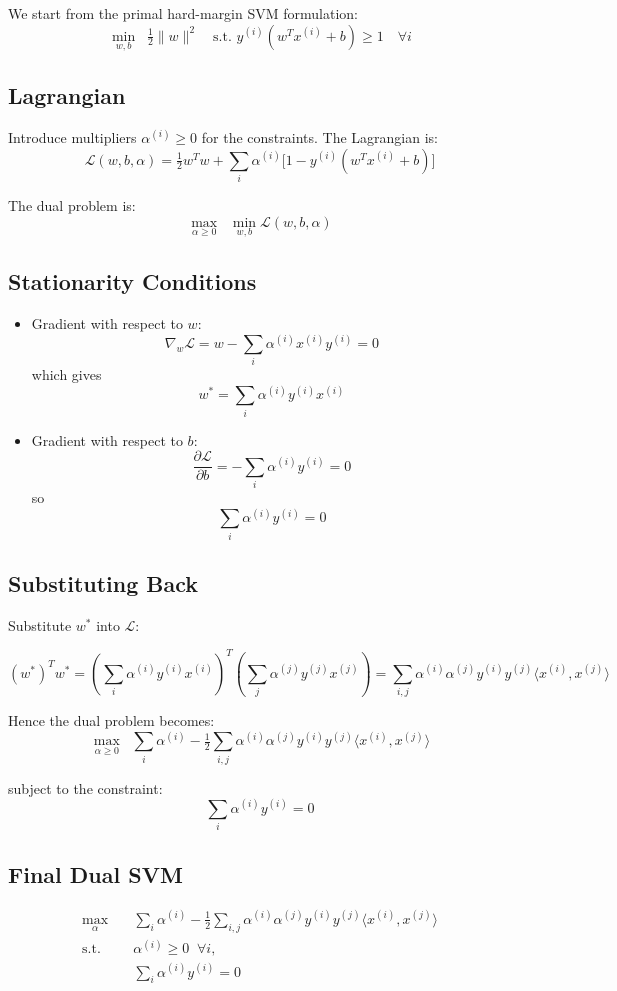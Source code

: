 \documentclass[11pt]{article}
\begin{document}
We start from the primal hard-margin SVM formulation:
\[
\min_{w,b} \;\; \tfrac{1}{2} \|w\|^2 
\quad \text{s.t. } y^{(i)} (w^T x^{(i)} + b) \geq 1 \quad \forall i
\]

\subsection*{Lagrangian}
Introduce multipliers $\alpha^{(i)} \geq 0$ for the constraints. The Lagrangian is:
\[
\mathcal{L}(w,b,\alpha) 
= \tfrac{1}{2} w^T w 
+ \sum_i \alpha^{(i)} \Big[1 - y^{(i)} (w^T x^{(i)} + b)\Big]
\]

The dual problem is:
\[
\max_{\alpha \geq 0} \;\; \min_{w,b} \mathcal{L}(w,b,\alpha)
\]

\subsection*{Stationarity Conditions}

\begin{itemize}
    \item Gradient with respect to $w$:
    \[
    \nabla_w \mathcal{L} = w - \sum_i \alpha^{(i)} x^{(i)} y^{(i)} = 0
    \]
    which gives
    \[
    w^* = \sum_i \alpha^{(i)} y^{(i)} x^{(i)}
    \]

    \item Gradient with respect to $b$:
    \[
    \frac{\partial \mathcal{L}}{\partial b} 
    = - \sum_i \alpha^{(i)} y^{(i)} = 0
    \]
    so
    \[
    \sum_i \alpha^{(i)} y^{(i)} = 0
    \]
\end{itemize}

\subsection*{Substituting Back}
Substitute $w^*$ into $\mathcal{L}$:

\[
(w^*)^T w^* = 
\left( \sum_i \alpha^{(i)} y^{(i)} x^{(i)} \right)^T
\left( \sum_j \alpha^{(j)} y^{(j)} x^{(j)} \right)
= \sum_{i,j} \alpha^{(i)} \alpha^{(j)} y^{(i)} y^{(j)} \langle x^{(i)}, x^{(j)} \rangle
\]

Hence the dual problem becomes:
\[
\max_{\alpha \geq 0} 
\;\; \sum_i \alpha^{(i)} 
- \tfrac{1}{2} \sum_{i,j} \alpha^{(i)} \alpha^{(j)} y^{(i)} y^{(j)} \langle x^{(i)}, x^{(j)} \rangle
\]

subject to the constraint:
\[
\sum_i \alpha^{(i)} y^{(i)} = 0
\]

\subsection*{Final Dual SVM}
\[
\boxed{
\begin{aligned}
\max_{\alpha} \quad & 
\sum_i \alpha^{(i)} 
- \tfrac{1}{2} \sum_{i,j} \alpha^{(i)} \alpha^{(j)} y^{(i)} y^{(j)} \langle x^{(i)}, x^{(j)} \rangle \\
\text{s.t.} \quad & \alpha^{(i)} \geq 0 \;\; \forall i, \\
& \sum_i \alpha^{(i)} y^{(i)} = 0
\end{aligned}
}
\]
\end{document}
